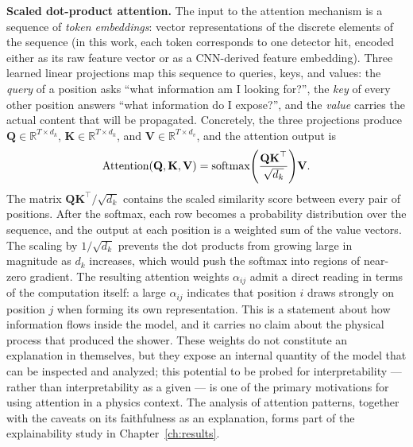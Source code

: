 \textbf{Scaled dot-product attention.} The input to the attention mechanism is a sequence of \textit{token embeddings}: vector representations of the discrete elements of the sequence (in this work, each token corresponds to one detector hit, encoded either as its raw feature vector or as a CNN-derived feature embedding). Three learned linear projections map this sequence to queries, keys, and values: the \textit{query} of a position asks ``what information am I looking for?'', the \textit{key} of every other position answers ``what information do I expose?'', and the \textit{value} carries the actual content that will be propagated. Concretely, the three projections produce $\textbf{Q} \in \mathbb{R}^{T \times d_k}$, $\textbf{K} \in \mathbb{R}^{T \times d_k}$, and $\textbf{V} \in \mathbb{R}^{T \times d_v}$, and the attention output is
\begin{equation}
    \text{Attention}(\textbf{Q}, \textbf{K}, \textbf{V}) = \text{softmax}\qty(\frac{\textbf{QK}^\top}{\sqrt{d_k}})\textbf{V}.
\end{equation}
The matrix $\textbf{QK}^{\top}/\sqrt{d_k}$ contains the scaled similarity score between every pair of positions. After the softmax, each row becomes a probability distribution over the sequence, and the output at each position is a weighted sum of the value vectors. The scaling by $1/\sqrt{d_k}$ prevents the dot products from growing large in magnitude as $d_k$ increases, which would push the softmax into regions of near-zero gradient. The resulting attention weights $\alpha_{ij}$ admit a direct reading in terms of the computation itself: a large $\alpha_{ij}$ indicates that position $i$ draws strongly on position $j$ when forming its own representation. This is a statement about how information flows inside the model, and it carries no claim about the physical process that produced the shower. These weights do not constitute an explanation in themselves, but they expose an internal quantity of the model that can be inspected and analyzed; this potential to be probed for interpretability --- rather than interpretability as a given --- is one of the primary motivations for using attention in a physics context. The analysis of attention patterns, together with the caveats on its faithfulness as an explanation, forms part of the explainability study in Chapter~\ref{ch:results}.

